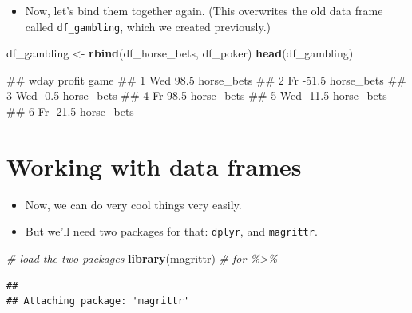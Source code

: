 \documentclass[
]{book}
\newenvironment{Shaded}{\begin{snugshade}}{\end{snugshade}}
\newcommand{\CommentTok}[1]{\textcolor[rgb]{0.56,0.35,0.01}{\textit{#1}}}
\newcommand{\FunctionTok}[1]{\textcolor[rgb]{0.13,0.29,0.53}{\textbf{#1}}}
\newcommand{\NormalTok}[1]{#1}
\newcommand{\OtherTok}[1]{\textcolor[rgb]{0.56,0.35,0.01}{#1}}
\providecommand{\tightlist}{%
  \setlength{\itemsep}{0pt}\setlength{\parskip}{0pt}}
\begin{document}
\begin{itemize}
\tightlist
\item
  Now, let's bind them together again. (This overwrites the old data frame called \texttt{df\_gambling}, which we created previously.)
\end{itemize}

\begin{Shaded}
\begin{Highlighting}[]
\NormalTok{df\_gambling }\OtherTok{\textless{}{-}} \FunctionTok{rbind}\NormalTok{(df\_horse\_bets, df\_poker)}
\FunctionTok{head}\NormalTok{(df\_gambling)}
\end{Highlighting}
\end{Shaded}

\begin{Shaded}
\begin{Highlighting}[]
\NormalTok{\#\#   wday profit       game}
\NormalTok{\#\# 1  Wed   98.5 horse\_bets}
\NormalTok{\#\# 2   Fr  {-}51.5 horse\_bets}
\NormalTok{\#\# 3  Wed   {-}0.5 horse\_bets}
\NormalTok{\#\# 4   Fr   98.5 horse\_bets}
\NormalTok{\#\# 5  Wed  {-}11.5 horse\_bets}
\NormalTok{\#\# 6   Fr  {-}21.5 horse\_bets}
\end{Highlighting}
\end{Shaded}

\hypertarget{working-with-data-frames}{%
\section{Working with data frames}\label{working-with-data-frames}}

\begin{itemize}
\tightlist
\item
  Now, we can do very cool things very easily.
\item
  But we'll need two packages for that: \texttt{dplyr}, and \texttt{magrittr}.
\end{itemize}

\begin{Shaded}
\begin{Highlighting}[]
\CommentTok{\# load the two packages}
\FunctionTok{library}\NormalTok{(magrittr) }\CommentTok{\# for \textquotesingle{}\%\textgreater{}\%\textquotesingle{}}
\end{Highlighting}
\end{Shaded}

\begin{verbatim}
## 
## Attaching package: 'magrittr'
\end{verbatim}
\end{document}
